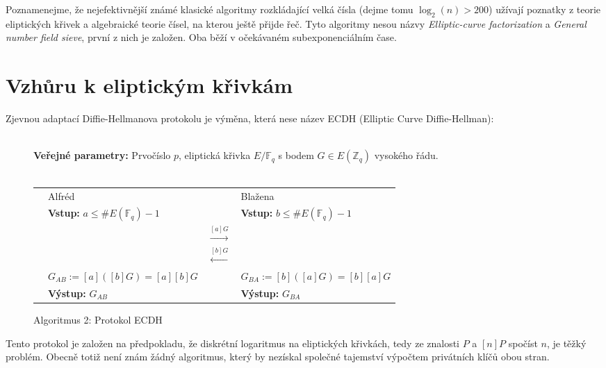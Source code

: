 \documentclass [12pt]{report}
\begin{document}
Poznamenejme, že nejefektivnější známé klasické algoritmy rozkládající velká čísla (dejme tomu  $\log_2(n)>200$) užívají poznatky z teorie eliptických křivek a algebraické teorie čísel, na kterou ještě přijde řeč. Tyto algoritmy nesou názvy \textit{Elliptic-curve factorization} a \textit{General number field sieve}, první z nich je založen. Oba běží v očekávaném subexponenciálním čase.

\section{Vzhůru k eliptickým křivkám}


Zjevnou adaptací Diffie-Hellmanova protokolu je výměna, která nese název ECDH (Elliptic Curve Diffie-Hellman):
\begin{figure}[h]
\begin{center} 
\makebox[1cm]{\rule{17.3cm}{0.4pt}}\\
\hspace{-1.35cm} \textbf{Veřejné parametry:} Prvočíslo $p$, eliptická křivka $E/\mathbb{F}_q$ s bodem $G \in E(\mathbb{Z}_q)$ vysokého řádu.\\

\vspace{-0.25cm}
\makebox[\linewidth]{\rule{17.3cm}{0.4pt}}\\
\vspace{0.2cm}
\begin{tabular}{l l c l}
\cline{2-2} \cline{4-4} 
& Alfréd & & Blažena \\ 
\cline{2-2} \cline{4-4} 
& \textbf{Vstup:} $a \leqslant \# E(\mathbb{F}_q)-1$ & & \textbf{Vstup:} $b \leqslant \# E(\mathbb{F}_q)-1$ \\
 & & $\stackrel{[a]G}{\longrightarrow} $ &  \\
&  & $\stackrel{[b]G}{\longleftarrow} $ &  \\
& $G_{AB} := [a]([b]G) = [a][b]G$ &  & $ G_{BA} := [b]([a]G) = [b][a]G$ \\
& \textbf{Výstup:} $G_{AB}$ & & \textbf{Výstup:} $G_{BA}$
\end{tabular}
\caption*{Algoritmus 2: Protokol ECDH}

\end{center}
\end{figure}

Tento protokol je založen na předpokladu, že diskrétní logaritmus na eliptických křivkách, tedy ze znalosti $P$ a $[n]P$ spočíst $n$, je těžký problém. Obecně totiž není znám žádný algoritmus, který by nezískal společné tajemství výpočtem privátních klíčů obou stran.\\
\end{document}
